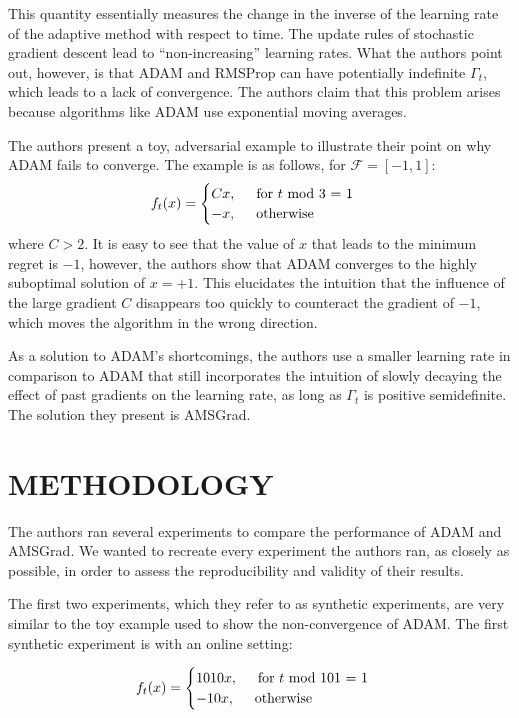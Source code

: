 \documentclass[letterpaper, 10 pt, conference]{ieeeconf}  %
\begin{document}
This quantity essentially measures the change in the inverse of the learning rate of the adaptive method with respect to time. The update rules of stochastic gradient descent lead to ``non-increasing'' learning rates. What the authors point out, however, is that ADAM and RMSProp can have potentially indefinite $\Gamma_{t}$, which leads to a lack of convergence. The authors claim that this problem arises because algorithms like ADAM use exponential moving averages. \par
The authors present a toy, adversarial example to illustrate their point on why ADAM fails to converge. The example is as follows, for $\mathcal{F} = [-1, 1]$:
\[
    f_{t}(x) = 
    \begin{cases}
     	Cx, \hspace{5mm} \text{for } t \text{ mod 3 = 1} \\
        -x, \hspace{5mm} \text{otherwise}
    \end{cases}
\]
where $C>2$. It is easy to see that the value of $x$ that leads to the minimum regret is $-1$, however, the authors show that ADAM converges to the highly suboptimal solution of $x = +1$. This elucidates the intuition that the influence of the large gradient $C$ disappears too quickly to counteract the gradient of $-1$, which moves the algorithm in the wrong direction. \par
As a solution to ADAM's shortcomings, the authors use a smaller learning rate in comparison to ADAM that still incorporates the intuition of slowly decaying the effect of past gradients on the learning rate, as long as $\Gamma_{t}$ is positive semidefinite. The solution they present is AMSGrad. \newline

\section{METHODOLOGY}
The authors ran several experiments to compare the performance of ADAM and AMSGrad. We wanted to recreate every experiment the authors ran, as closely as possible, in order to assess the reproducibility and validity of their results. 
\par The first two experiments, which they refer to as synthetic experiments, are very similar to the toy example used to show the non-convergence of ADAM. The first synthetic experiment is with an online setting:

\[
    f_{t}(x) = 
    \begin{cases}
     	1010x, \hspace{5mm} \text{for } t \text{ mod 101 = 1} \\
        -10x, \hspace{5mm} \text{otherwise}
    \end{cases}
\]
\end{document}
